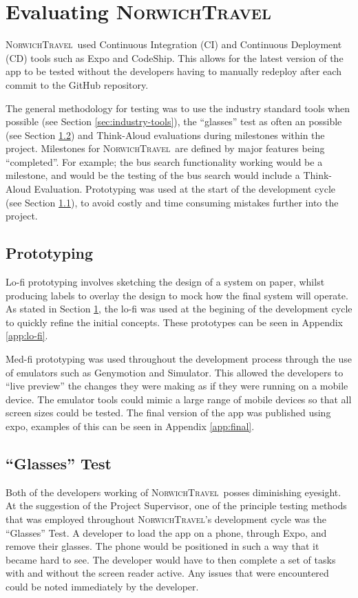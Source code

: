 \documentclass[cmpstyle]{ueacmpstyle}
\newcommand{\nt}{\textsc{NorwichTravel}}
\begin{document}
	\section{Evaluating \nt} \label{sec:eval}
	\nt \ used Continuous Integration (CI) and Continuous Deployment (CD) tools such as Expo and CodeShip. This allows for the latest version of the app to be tested without the developers having to manually redeploy after each commit to the GitHub repository. 
	
	The general methodology for testing was to use the industry standard tools when possible (see Section \ref{sec:industry-tools}), the ``glasses'' test as often an possible (see Section \ref{sec:glasses}) and Think-Aloud evaluations during milestones within the project. Milestones for \nt \ are defined by major features being ``completed''. For example; the bus search functionality working would be a milestone, and would be the testing of the bus search would include a Think-Aloud Evaluation. Prototyping was used at the start of the development cycle (see Section \ref{sec:proto}), to avoid costly and time consuming mistakes further into the project.
	
		\subsection{Prototyping} \label{sec:proto}
		Lo-fi prototyping involves sketching the design of a system on paper, whilst producing labels to overlay the design to mock how the final system will operate. As stated in Section \ref{sec:eval}, the lo-fi was used at the begining of the development cycle to quickly refine the initial concepts. These prototypes can be seen in Appendix \ref{app:lo-fi}.
		
		Med-fi prototyping was used throughout the development process through the use of emulators such as Genymotion and Simulator. This allowed the developers to ``live preview'' the changes they were making as if they were running on a mobile device. The emulator tools could mimic a large range of mobile devices so that all screen sizes could be tested. The final version of the app was published using expo, examples of this can be seen in Appendix \ref{app:final}.
			
		\subsection{``Glasses'' Test} \label{sec:glasses}
		Both of the developers working of \nt \ posses diminishing eyesight. At the suggestion of the Project Supervisor, one of the principle testing methods that was employed throughout \nt's development cycle was the ``Glasses'' Test. A developer to load the app on a phone, through Expo, and remove their glasses. The phone would be positioned in such a way that it became hard to see. The developer would have to then complete a set of tasks with and without the screen reader active. Any issues that were encountered could be noted immediately by the developer. 
		
\end{document}
